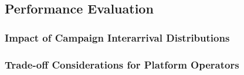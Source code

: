 \subsection{Performance Evaluation}\label{sec:cloud:crowdsourcing:performance_evaluation}
\subsubsection*{Impact of Campaign Interarrival Distributions}
\subsubsection*{Trade-off Considerations for Platform Operators}
